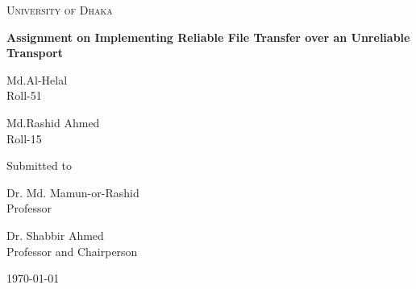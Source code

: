 \documentclass[12pt,a4paper]{report}
\begin{document}
\begin{titlepage}
\centering
{\scshape\LARGE University of Dhaka \par}
\vspace{1.5cm}
{\huge\bfseries Assignment on Implementing Reliable File Transfer over an Unreliable Transport\par}
\vspace{3cm}
{\Large\itshape \parbox{5cm}{\centering Md.Al-Helal\\Roll-51}\hspace{1cm}\parbox{6cm}{\centering Md.Rashid Ahmed\\Roll-15}}
\vfill
Submitted to\\
\vspace{0.8cm}
{\itshape \parbox{6cm}{\centering Dr. Md. Mamun-or-Rashid \\ Professor}\hspace{1cm}\parbox{5cm}{\centering Dr. Shabbir Ahmed \\Professor and Chairperson}}
\vfill
{\large \today\par}
\end{titlepage}
\end{document}
